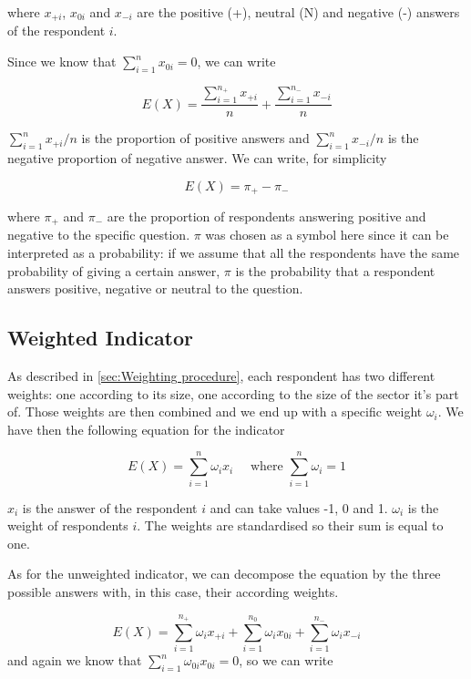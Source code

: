 \documentclass[12pt,a4paper,oneside]{book}
\begin{document}
where 
$x_{+i}$, $x_{0i}$ and $x_{-i}$ are the positive (+), neutral (N) and negative (-) answers of the respondent $i$.

Since we know that $\sum_{i=1}^n x_{0i} = 0$, we can write

\begin{equation}
    E(X) = \frac{\sum_{i=1}^{n_+} x_{+i}}{n}  + \frac{\sum_{i=1}^{n_-} x_{-i}}{n}
\end{equation} 

${\sum_{i=1}^n x_{+i}}/{n}$ is the proportion of positive answers and ${\sum_{i=1}^n x_{-i}}/{n}$ is the negative proportion of negative answer. We can write, for simplicity

\begin{equation}
    E(X) = \pi_+ - \pi_-  \label{eq: BSI Unweighted}
\end{equation}

where $\pi_+$ and $\pi_-$ are the proportion of respondents answering positive and negative to the specific question.
$\pi$ was chosen as a symbol here since it can be interpreted as a probability: if we assume that all the respondents have the same probability of giving a certain answer, $\pi$ is the probability that a respondent answers positive, negative or neutral to the question. 


\subsection{Weighted Indicator}

As described in \autoref{sec:Weighting procedure}, each respondent has two different weights: one according to its size, one according to the size of the sector it's part of. Those weights are then combined and we end up with a specific weight $\omega_i$.
We have then the following equation for the indicator

\begin{equation}
    E(X) = \sum_{i=1}^n \omega_i x_i  \quad \text{  where  } \sum_{i=1}^n \omega_i =  1
\end{equation} 

$x_i$ is the answer of the respondent $i$ and can take values -1, 0 and 1.
$\omega_i$ is the weight of respondents $i$. 
The weights are standardised so their sum is equal to one.

As for the unweighted indicator, we can decompose the equation by the three possible answers with, in this case, their according weights.

\begin{equation}
    E(X) = \sum_{i=1}^{n_+} \omega_{i} x_{+i} + \sum_{i=1}^{n_0} \omega_{i} x_{0i} + \sum_{i=1}^{n_-} \omega_{i} x_{-i}
 \end{equation}
and again we know that $\sum_{i=1}^n \omega_{0i} x_{0i} = 0$, so we can write
\end{document}
